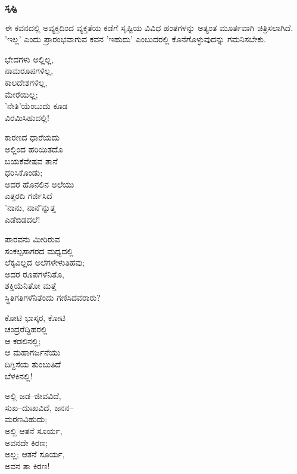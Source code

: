 
\begin{center}
\textbf{ಸೃಷ್ಟಿ}
\end{center}

ಈ ಕವನದಲ್ಲಿ ಅವ್ಯಕ್ತದಿಂದ ವ್ಯಕ್ತತೆಯ ಕಡೆಗೆ ಸೃಷ್ಟಿಯ ವಿವಿಧ ಹಂತಗಳನ್ನು ಅತ್ಯಂತ ಮೂರ್ತವಾಗಿ ಚಿತ್ರಿಸಲಾಗಿದೆ. 'ಇಲ್ಲ' ಎಂದು ಪ್ರಾರಂಭವಾಗುವ ಕವನ 'ಇಹುದು' ಎಂಬುದರಲ್ಲಿ ಕೊನೆಗೊಳ್ಳುವುದನ್ನು ಗಮನಿಸಬೇಕು.

\begin{myquote}
ಭೇದಗಳು ಅಲ್ಲಿಲ್ಲ,\\ನಾಮರೂಪಗಳಿಲ್ಲ,\\ಕಾಲದೇಶಗಳಿಲ್ಲ,\\ಮೇರೆಯಿಲ್ಲ;\\'ನೇತಿ'ಯೆಂಬುದು ಕೂಡ\\ವಿರಮಿಸಿಹುದಲ್ಲಿ!
\end{myquote}

\begin{myquote}
ಕಾರಣದ ಧಾರೆಯದು\\ಅಲ್ಲಿಂದ ಹರಿಯಿತದೊ\\ಬಯಕೆವೇಷವ ತಾನೆ\\ಧರಿಸಿಕೊಂಡು;\\ಅದರ ಹೊನಲಿನ ಅಲೆಯು\\ಎತ್ತರದಿ ಗರ್ಜಿಸಿದೆ\\'ನಾನು, ನಾನೆ'ನ್ನುತ್ತ\\ಎಡೆಬಿಡದಲೆ!
\end{myquote}

\begin{myquote}
ಪಾರವನು ಮೀರಿರುವ\\ಸಂಕಲ್ಪಸಾಗರದ ಮಧ್ಯದಲ್ಲಿ\\ಲೆಕ್ಕವಿಲ್ಲದ ಅಲೆಗಳೇಳುತಿಹವು;\\ಅದರ ರೂಪಗಳೆನಿತೊ,\\ಶಕ್ತಿಯೆನಿತೋ ಮತ್ತೆ\\ಸ್ಥಿತಿಗತಿಗಳೆನಿತೆಂದು ಗಣಿಸಿದವರಾರು?
\end{myquote}

\begin{myquote}
ಕೋಟಿ ಭಾಸ್ಕರ, ಕೋಟಿ\\ಚಂದ್ರರೆದ್ದಿಹರಲ್ಲಿ\\ಆ ಕಡಲಿನಲ್ಲಿ;\\ಆ ಮಹಾಗರ್ಜನೆಯು\\ದಿಗ್ದಿಸೆಯ ತುಂಬುತಿದೆ\\ಬೆಳಕಿನಲ್ಲಿ!
\end{myquote}

\begin{myquote}
ಅಲ್ಲಿ ಜಡ–ಜೀವವಿದೆ,\\ಸುಖ–ದುಃಖವಿದೆ, ಜನನ–\\ಮರಣವಿಹುದು;\\ಅಲ್ಲಿ ಆತನೆ ಸೂರ್ಯ,\\ಅವನದೇ ಕಿರಣ;\\ಅಲ್ಲ; ಆತನೆ ಸೂರ್ಯ,\\ಅವನ ತಾ ಕಿರಣ!
\end{myquote}

